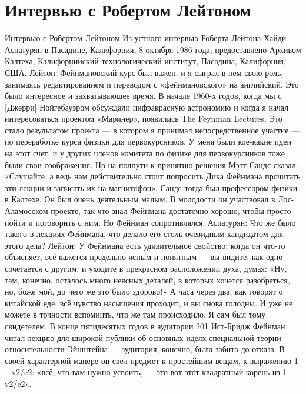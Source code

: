 \documentclass[10pt,oneside]{article}
\begin{document}
\section*{Интервью с Робертом Лейтоном}
\label{tips-sec-7-интервью-с-робертом-лейтоном}
Интервью с Робертом Лейтоном Из устного интервью Роберта Лейтона Хайди Аспатурян в Пасадине, Калифорния, 8 октября 1986 года, предоставлено Архивом Калтеха, Калифорнийский технологический институт, Пасадина, Калифорния, США. Лейтон: Фейнмановский курс был важен, и я сыграл в нем свою роль, занимаясь редактированием и переводом с «фейнмановского» на английский. Это было интересное и захватывающее время. В начале 1960-х годов, когда мы с [Джерри] Нойгебауэром обсуждали инфракрасную астрономию и когда я начал интересоваться проектом «Маринер», появились The Feynman Lectures. Это стало результатом проекта --- в котором я принимал непосредственное участие --- по переработке курса физики для первокурсников. У меня были кое-какие идеи на этот счет, и у других членов комитета по физике для первокурсников тоже были свои соображения. Но на полпути к принятию решения Мэтт Сандс сказал: «Слушайте, а ведь нам действительно стоит попросить Дика Фейнмана прочитать эти лекции и записать их на магнитофон». Сандс тогда был профессором физики в Калтехе. Он был очень деятельным малым. В молодости он участвовал в Лос-Аламосском проекте, так что знал Фейнмана достаточно хорошо, чтобы просто пойти и поговорить с ним. Но Фейнман сопротивлялся. Аспатурян: Что же было такого в лекциях Фейнмана, что делало его столь очевидным кандидатом для этого дела? Лейтон: У Фейнмана есть удивительное свойство: когда он что-то объясняет, всё кажется предельно ясным и понятным --- вы видите, как одно сочетается с другим, и уходите в прекрасном расположении духа, думая: «Ну, там, конечно, осталось много неясных деталей, в которых хочется разобраться, но, боже мой, до чего же это было здорово!» А часа через два, как говорят о китайской еде, всё чувство насыщения проходит, и вы снова голодны. И уже не можете в точности вспомнить, что же там происходило. Я сам был тому свидетелем. В конце пятидесятых годов в аудитории 201 Ист-Бридж Фейнман читал лекцию для широкой публики об основных идеях специальной теории относительности Эйнштейна --- аудитория, конечно, была забита до отказа. В своей характерной манере он свел предмет к простейшим вещам, к выражению 1 – v2/c2: «всё, что вам нужно усвоить, --- это вот этот квадратный корень из 1 – v2/c2».\par
\end{document}
